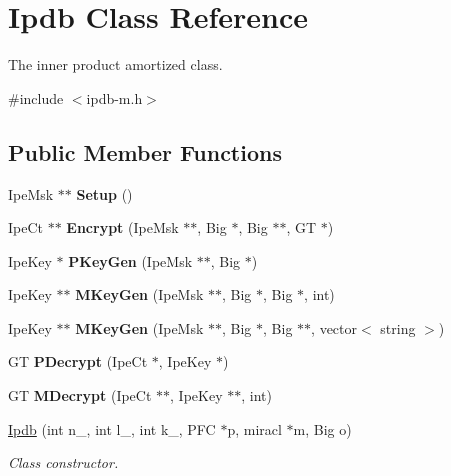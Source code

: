 \hypertarget{classIpdb}{}\section{Ipdb Class Reference}
\label{classIpdb}


The inner product amortized class.  




{\ttfamily \#include $<$ipdb-\/m.\+h$>$}

\subsection*{Public Member Functions}
\begin{DoxyCompactItemize}
\item 
Ipe\+Msk $\ast$$\ast$ {\bfseries Setup} ()\hypertarget{classIpdb_a536a77dfa585af86dcda04ce54729481}{}\label{classIpdb_a536a77dfa585af86dcda04ce54729481}

\item 
Ipe\+Ct $\ast$$\ast$ {\bfseries Encrypt} (Ipe\+Msk $\ast$$\ast$, Big $\ast$, Big $\ast$$\ast$, GT $\ast$)\hypertarget{classIpdb_a5cc54a99bd6def6df87d42577004a334}{}\label{classIpdb_a5cc54a99bd6def6df87d42577004a334}

\item 
Ipe\+Key $\ast$ {\bfseries P\+Key\+Gen} (Ipe\+Msk $\ast$$\ast$, Big $\ast$)\hypertarget{classIpdb_a8ae642b00bf1af0e651373aca8cb36eb}{}\label{classIpdb_a8ae642b00bf1af0e651373aca8cb36eb}

\item 
Ipe\+Key $\ast$$\ast$ {\bfseries M\+Key\+Gen} (Ipe\+Msk $\ast$$\ast$, Big $\ast$, Big $\ast$, int)\hypertarget{classIpdb_a3d07c53866927028d0dbee4a65f9130b}{}\label{classIpdb_a3d07c53866927028d0dbee4a65f9130b}

\item 
Ipe\+Key $\ast$$\ast$ {\bfseries M\+Key\+Gen} (Ipe\+Msk $\ast$$\ast$, Big $\ast$, Big $\ast$$\ast$, vector$<$ string $>$)\hypertarget{classIpdb_aaf2427cc5ac4b8f62f8c716c43e19f41}{}\label{classIpdb_aaf2427cc5ac4b8f62f8c716c43e19f41}

\item 
GT {\bfseries P\+Decrypt} (Ipe\+Ct $\ast$, Ipe\+Key $\ast$)\hypertarget{classIpdb_a791f8e59c6fe1009d4bb8fc8c59675f6}{}\label{classIpdb_a791f8e59c6fe1009d4bb8fc8c59675f6}

\item 
GT {\bfseries M\+Decrypt} (Ipe\+Ct $\ast$$\ast$, Ipe\+Key $\ast$$\ast$, int)\hypertarget{classIpdb_af3ea6b414a1273a68e563176b0456d02}{}\label{classIpdb_af3ea6b414a1273a68e563176b0456d02}

\item 
\hyperlink{classIpdb_af211f93d19bfc4b6656989b608aec11e}{Ipdb} (int n\+\_\+, int l\+\_\+, int k\+\_\+, P\+FC $\ast$p, miracl $\ast$m, Big o)
\begin{DoxyCompactList}\small\item\em Class constructor. \end{DoxyCompactList}\end{DoxyCompactItemize}
